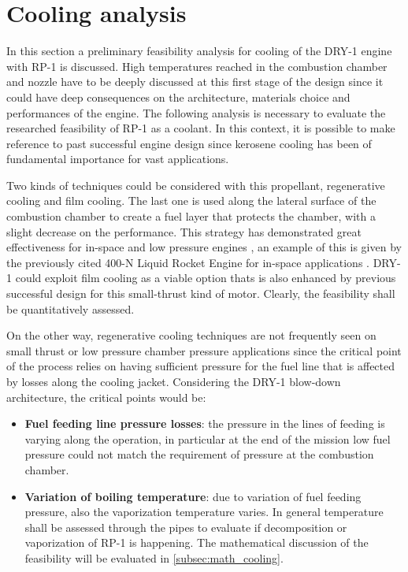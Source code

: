 \section{Cooling analysis}
\label{sec:cooling}

In this section a preliminary feasibility analysis for cooling of the DRY-1 engine with RP-1 is discussed.
High temperatures reached in the combustion chamber and nozzle have to be deeply discussed at this first stage of the design since it could have deep consequences on the architecture, materials choice and performances of the engine. The following analysis is necessary to evaluate the researched feasibility of RP-1 as a coolant. In this context, it is possible to make reference to past successful engine design since kerosene cooling has been of fundamental importance for vast applications.

Two kinds of techniques could be considered with this propellant, regenerative cooling and film cooling. The last one is used along the lateral surface of the combustion chamber to create a fuel layer that protects the chamber, with a slight decrease on the performance. This strategy has demonstrated great effectiveness for in-space and low pressure engines \cite{cambridge}, an example of this is given by the previously cited 400-N Liquid Rocket Engine for in-space applications \cite{ariane_datasheet}. DRY-1 could exploit film cooling as a viable option thats is also enhanced by previous successful design for this small-thrust kind of motor. Clearly, the feasibility shall be quantitatively assessed.

On the other way, regenerative cooling techniques are not frequently seen on small thrust or low pressure chamber pressure applications since the critical point of the process relies on having sufficient pressure for the fuel line that is affected by losses along the cooling jacket. Considering the DRY-1 blow-down architecture, the critical points would be:

\begin{itemize}
    \item \textbf{Fuel feeding line pressure losses}: the pressure in the lines of feeding is varying along the operation, in particular at the end of the mission low fuel pressure could not match the requirement of pressure at the combustion chamber.
    \item \textbf{Variation of boiling temperature}: due to variation of fuel feeding pressure, also the vaporization temperature varies. In general temperature shall be assessed through the pipes to evaluate if decomposition or vaporization of RP-1 is happening. The mathematical discussion of the feasibility will be evaluated in \autoref{subsec:math_cooling}.
\end{itemize}

